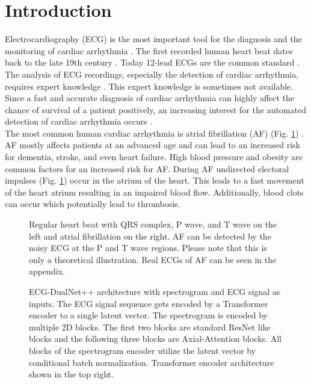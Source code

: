 \section{Introduction} \label{sec:introduction}

Electrocardiography (ECG) is the most important tool for the diagnosis and the monitoring of cardiac arrhythmia \cite{Becker2006, Anderson2009, Alghatrif2012}. The first recorded human heart beat dates back to the late 19th century \cite{Alghatrif2012}. Today 12-lead ECGs are the common standard \cite{Alghatrif2012}. The analysis of ECG recordings, especially the detection of cardiac arrhythmia, requires expert knowledge \cite{Becker2006}. This expert knowledge is sometimes not available. Since a fast and accurate diagnosis of cardiac arrhythmia can highly affect the chance of survival of a patient positively, an increasing interest for the automated detection of cardiac arrhythmia occurs \cite{Becker2006, Antink2017, Zihlmann2017, Clifford2017}. \\
\indent The most common human cardiac arrhythmia is atrial fibrillation (AF) (Fig. \ref{fig:beat}) \cite{Herold2019}. AF mostly affects patients at an advanced age and can lead to an increased risk for dementia, stroke, and even heart failure. High blood pressure and obesity are common factors for an increased risk for AF. During AF undirected electoral impulses (Fig. \ref{fig:beat}) occur in the atrium of the heart. This leads to a fast movement of the heart atrium resulting in an impaired blood flow. Additionally, blood clots can occur which potentially lead to thrombosis. \cite{Becker2006, Herold2019}\\
\begin{figure}[!ht] 
    \centering
    
    \caption{Regular heart beat with QRS complex, P wave, and T wave on the left and atrial fibrillation on the right. AF can be detected by the noisy ECG at the P and T wave regions. Please note that this is only a theoretical illustration. Real ECGs of AF can be seen in the appendix.}
    \label{fig:beat}
\end{figure}
\begin{figure*}[!ht]
    \centering
    
    \caption{ECG-DualNet++ architecture with spectrogram and ECG signal as inputs. The ECG signal sequence gets encoded by a Transformer encoder to a single latent vector. The spectrogram is encoded by multiple 2D blocks. The first two blocks are standard ResNet like blocks and the following three blocks are Axial-Attention blocks. All blocks of the spectrogram encoder utilize the latent vector by conditional batch normalization. Transformer encoder \cite{Vaswani2017} architecture shown in the top right.}
    \label{fig:ecg_dual_net}
\end{figure*}
